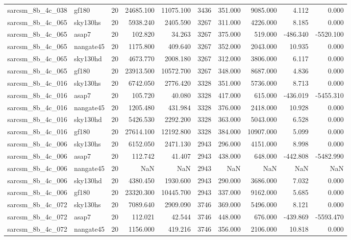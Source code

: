 \begin{longtable}{llrrrrrrrr}
sarcsm\_8b\_4c\_038 & gf180 & 20 & 24685.100 & 11075.100 & 3436 & 351.000 & 9085.000 & 4.112 & 0.000 \\
sarcsm\_8b\_4c\_065 & sky130hs & 20 & 5938.240 & 2405.590 & 3267 & 311.000 & 4226.000 & 8.185 & 0.000 \\
sarcsm\_8b\_4c\_065 & asap7 & 20 & 102.820 & 34.263 & 3267 & 375.000 & 519.000 & -486.340 & -5520.100 \\
sarcsm\_8b\_4c\_065 & nangate45 & 20 & 1175.800 & 409.640 & 3267 & 352.000 & 2043.000 & 10.935 & 0.000 \\
sarcsm\_8b\_4c\_065 & sky130hd & 20 & 4673.770 & 2008.180 & 3267 & 312.000 & 3806.000 & 6.117 & 0.000 \\
sarcsm\_8b\_4c\_065 & gf180 & 20 & 23913.500 & 10572.700 & 3267 & 348.000 & 8687.000 & 4.836 & 0.000 \\
sarcsm\_8b\_4c\_016 & sky130hs & 20 & 6742.050 & 2776.420 & 3328 & 351.000 & 5736.000 & 8.713 & 0.000 \\
sarcsm\_8b\_4c\_016 & asap7 & 20 & 105.720 & 40.080 & 3328 & 417.000 & 615.000 & -436.019 & -5455.310 \\
sarcsm\_8b\_4c\_016 & nangate45 & 20 & 1205.480 & 431.984 & 3328 & 376.000 & 2418.000 & 10.928 & 0.000 \\
sarcsm\_8b\_4c\_016 & sky130hd & 20 & 5426.530 & 2292.200 & 3328 & 363.000 & 5043.000 & 6.528 & 0.000 \\
sarcsm\_8b\_4c\_016 & gf180 & 20 & 27614.100 & 12192.800 & 3328 & 384.000 & 10907.000 & 5.099 & 0.000 \\
sarcsm\_8b\_4c\_006 & sky130hs & 20 & 6152.050 & 2471.130 & 2943 & 296.000 & 4151.000 & 8.998 & 0.000 \\
sarcsm\_8b\_4c\_006 & asap7 & 20 & 112.742 & 41.407 & 2943 & 438.000 & 648.000 & -442.808 & -5482.990 \\
sarcsm\_8b\_4c\_006 & nangate45 & 20 & NaN & NaN & 2943 & NaN & NaN & NaN & NaN \\
sarcsm\_8b\_4c\_006 & sky130hd & 20 & 4380.450 & 1930.600 & 2943 & 290.000 & 3686.000 & 7.032 & 0.000 \\
sarcsm\_8b\_4c\_006 & gf180 & 20 & 23320.300 & 10445.700 & 2943 & 337.000 & 9162.000 & 5.685 & 0.000 \\
sarcsm\_8b\_4c\_072 & sky130hs & 20 & 7089.640 & 2909.090 & 3746 & 369.000 & 5496.000 & 8.121 & 0.000 \\
sarcsm\_8b\_4c\_072 & asap7 & 20 & 112.021 & 42.544 & 3746 & 448.000 & 676.000 & -439.869 & -5593.470 \\
sarcsm\_8b\_4c\_072 & nangate45 & 20 & 1156.000 & 419.216 & 3746 & 356.000 & 2106.000 & 10.818 & 0.000 \\

\end{longtable}
